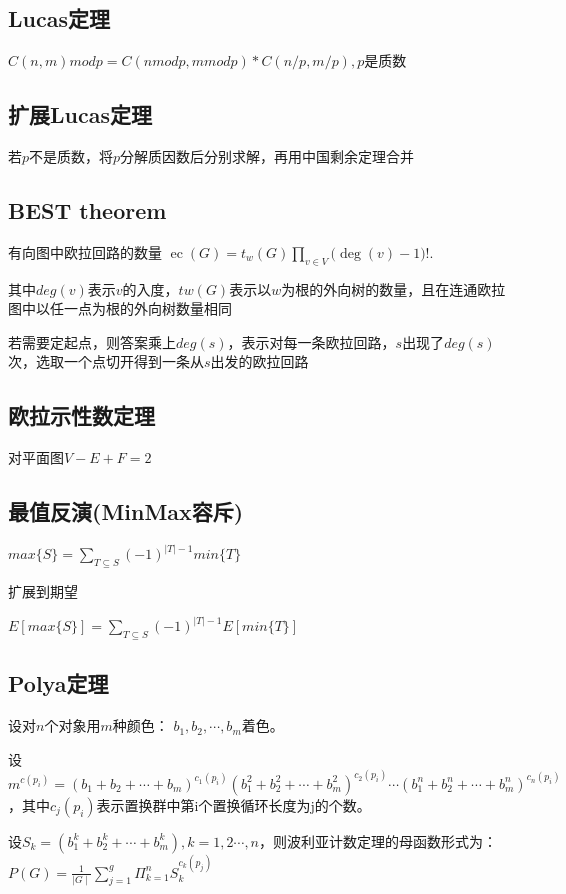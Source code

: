 \subsection{Lucas定理}
$C(n,m) mod p = C(n mod p, m mod p) * C(n / p, m / p),p$是质数\par

\subsection{扩展Lucas定理}
若$p$不是质数，将$p$分解质因数后分别求解，再用中国剩余定理合并\par

\subsection{BEST theorem}
有向图中欧拉回路的数量
 ${\displaystyle \operatorname {ec} (G)=t_{w}(G)\prod _{v\in V}{\bigl (}\deg(v)-1{\bigr )}!.} $ \par
其中$deg(v)$表示$v$的入度，$tw(G)$表示以$w$为根的外向树的数量，且在连通欧拉图中以任一点为根的外向树数量相同\par
若需要定起点，则答案乘上$deg(s)$，表示对每一条欧拉回路，$s$出现了$deg(s)$次，选取一个点切开得到一条从$s$出发的欧拉回路

\subsection{欧拉示性数定理}
对平面图$V-E+F=2$\par

\subsection{最值反演(MinMax容斥)}
$ max\{S\}=\sum_{T\subseteq S} (−1)^{|T|−1}min\{T\} $\par
扩展到期望\par
$ E[max\{S\}]=\sum_{T\subseteq S} (−1)^{|T|−1}E[min\{T\}] $\par

\subsection{Polya定理}
设对$n$个对象用$m$种颜色： ${\displaystyle b_{1},b_{2},\cdots ,b_{m}}$着色。\par
设${\displaystyle m^{c(p_{i})}=(b_{1}+b_{2}+\cdots +b_{m})^{c_{1}(p_{i})}(b_{1}^{2}+b_{2}^{2}+\cdots +b_{m}^{2})^{c_{2}(p_{i})}\cdots (b_{1}^{n}+b_{2}^{n}+\cdots +b_{m}^{n})^{c_{n}(p_{i})}}$，其中${\displaystyle c_{j}(p_{i})}$表示置换群中第i个置换循环长度为j的个数。\par
设${\displaystyle S_{k}=(b_{1}^{k}+b_{2}^{k}+\cdots +b_{m}^{k}),k=1,2\cdots ,n}$，则波利亚计数定理的母函数形式为：${\displaystyle P(G)={\frac {1}{\mid G\mid }}\sum _{j=1}^{g}\Pi _{k=1}^{n}S_{k}^{c_{k}(p_{j})}}$\par

